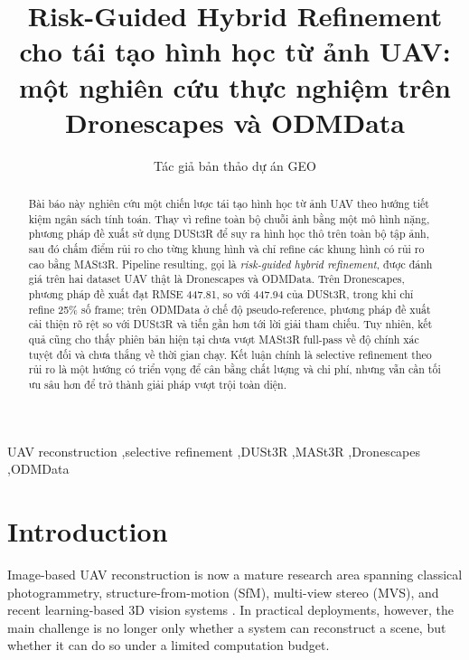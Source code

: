 \documentclass[preprint,12pt]{elsarticle}
\begin{document}
\begin{frontmatter}

\title{Risk-Guided Hybrid Refinement cho tái tạo hình học từ ảnh UAV: một nghiên cứu thực nghiệm trên Dronescapes và ODMData}

\author{Tác giả bản thảo dự án GEO}

\begin{abstract}
Bài báo này nghiên cứu một chiến lược tái tạo hình học từ ảnh UAV theo hướng tiết kiệm ngân sách tính toán. Thay vì refine toàn bộ chuỗi ảnh bằng một mô hình nặng, phương pháp đề xuất sử dụng DUSt3R để suy ra hình học thô trên toàn bộ tập ảnh, sau đó chấm điểm rủi ro cho từng khung hình và chỉ refine các khung hình có rủi ro cao bằng MASt3R. Pipeline resulting, gọi là \textit{risk-guided hybrid refinement}, được đánh giá trên hai dataset UAV thật là Dronescapes và ODMData. Trên Dronescapes, phương pháp đề xuất đạt RMSE 447.81, so với 447.94 của DUSt3R, trong khi chỉ refine 25\% số frame; trên ODMData ở chế độ pseudo-reference, phương pháp đề xuất cải thiện rõ rệt so với DUSt3R và tiến gần hơn tới lời giải tham chiếu. Tuy nhiên, kết quả cũng cho thấy phiên bản hiện tại chưa vượt MASt3R full-pass về độ chính xác tuyệt đối và chưa thắng về thời gian chạy. Kết luận chính là selective refinement theo rủi ro là một hướng có triển vọng để cân bằng chất lượng và chi phí, nhưng vẫn cần tối ưu sâu hơn để trở thành giải pháp vượt trội toàn diện.
\end{abstract}

\begin{keyword}
UAV reconstruction \sep selective refinement \sep DUSt3R \sep MASt3R \sep Dronescapes \sep ODMData
\end{keyword}

\end{frontmatter}

\section{Introduction}

Image-based UAV reconstruction is now a mature research area spanning classical photogrammetry, structure-from-motion (SfM), multi-view stereo (MVS), and recent learning-based 3D vision systems \citep{Colomina2014Unmanned,Jiang2017Efficient,Jiang2020Efficient,Schonberger2016SfM,Liu2023Deep,Liao2024High}. In practical deployments, however, the main challenge is no longer only whether a system can reconstruct a scene, but whether it can do so under a limited computation budget.
\end{document}
